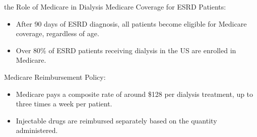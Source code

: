 \begin{frame}{the Role of Medicare in Dialysis}
Medicare Coverage for ESRD Patients:
\begin{itemize}
    \item After 90 days of ESRD diagnosis, all patients become eligible for Medicare coverage, regardless of age.
    \item Over 80\% of ESRD patients receiving dialysis in the US are enrolled in Medicare.
\end{itemize}

Medicare Reimbursement Policy:
\begin{itemize}
    \item Medicare pays a composite rate of around \$128 per dialysis treatment, up to three times a week per patient.
    \item Injectable drugs are reimbursed separately based on the quantity administered.
\end{itemize}



\end{frame}